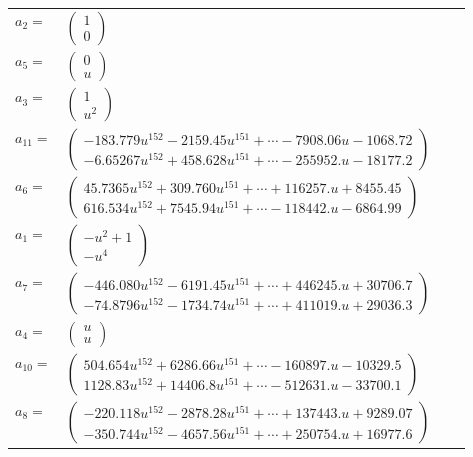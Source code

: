 \documentclass[1p]{elsarticle_modified}
\theoremstyle{definition}
\begin{document}
\begin{tabular}{m{7pt} m{180pt} m{7pt} m{180pt} }
\flushright $a_{2}=$&$\begin{pmatrix}1\\0\end{pmatrix}$ \\
\flushright $a_{5}=$&$\begin{pmatrix}0\\u\end{pmatrix}$ \\
\flushright $a_{3}=$&$\begin{pmatrix}1\\u^2\end{pmatrix}$ \\
\flushright $a_{11}=$&$\begin{pmatrix}-183.779 u^{152}-2159.45 u^{151}+\cdots-7908.06 u-1068.72\\-6.65267 u^{152}+458.628 u^{151}+\cdots-255952. u-18177.2\end{pmatrix}$ \\
\flushright $a_{6}=$&$\begin{pmatrix}45.7365 u^{152}+309.760 u^{151}+\cdots+116257. u+8455.45\\616.534 u^{152}+7545.94 u^{151}+\cdots-118442. u-6864.99\end{pmatrix}$ \\
\flushright $a_{1}=$&$\begin{pmatrix}- u^2+1\\- u^4\end{pmatrix}$ \\
\flushright $a_{7}=$&$\begin{pmatrix}-446.080 u^{152}-6191.45 u^{151}+\cdots+446245. u+30706.7\\-74.8796 u^{152}-1734.74 u^{151}+\cdots+411019. u+29036.3\end{pmatrix}$ \\
\flushright $a_{4}=$&$\begin{pmatrix}u\\u\end{pmatrix}$ \\
\flushright $a_{10}=$&$\begin{pmatrix}504.654 u^{152}+6286.66 u^{151}+\cdots-160897. u-10329.5\\1128.83 u^{152}+14406.8 u^{151}+\cdots-512631. u-33700.1\end{pmatrix}$ \\
\flushright $a_{8}=$&$\begin{pmatrix}-220.118 u^{152}-2878.28 u^{151}+\cdots+137443. u+9289.07\\-350.744 u^{152}-4657.56 u^{151}+\cdots+250754. u+16977.6\end{pmatrix}$ \\

\end{tabular}
\end{document}
